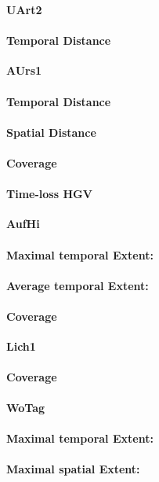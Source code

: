 \large
\centerline{\textbf{UArt2}}
\normalsize

\paragraph{Temporal Distance}

\large
\centerline{\textbf{AUrs1}}
\normalsize

\paragraph{Temporal Distance}
\paragraph{Spatial Distance}
\paragraph{Coverage}
\paragraph{Time-loss HGV}

\large
\centerline{\textbf{AufHi}}
\normalsize

\paragraph{Maximal temporal Extent:}
\paragraph{Average temporal Extent:}
\paragraph{Coverage}

\large
\centerline{\textbf{Lich1}}
\normalsize

\paragraph{Coverage}

\large
\centerline{\textbf{WoTag}}
\normalsize

\paragraph{Maximal temporal Extent:}
\paragraph{Maximal spatial Extent:}
